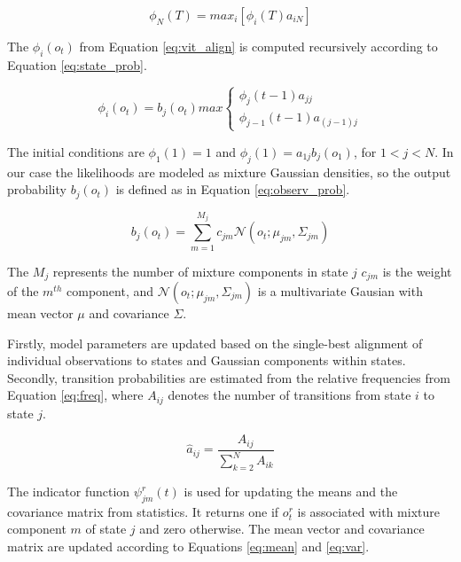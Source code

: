 \begin{equation}\label{eq:vit_align}
    \phi_N(T)= max_i[\phi_i(T)a_{iN}] 
\end{equation}


The $\phi_i(o_t)$ from Equation \ref{eq:vit_align} is computed recursively according to Equation \ref{eq:state_prob}.

\begin{equation}\label{eq:state_prob}
  \phi_i(o_t) = b_j(o_t) max \left\{
  \begin{array}{lr}
    \phi_j(t-1)a_{jj}\\
    \phi_{j-1}(t-1)a_{(j-1)j}
  \end{array}
  \right.
\end{equation}

The initial conditions are $\phi_1(1)=1$ and $\phi_j(1)= a_{1j}b_j(o_1)$, for $ 1 < j < N$. In our case the likelihoods are modeled as mixture Gaussian densities, so the output probability $b_j(o_t)$ is defined as in Equation \ref{eq:observ_prob}.

\begin{equation}\label{eq:observ_prob}
  b_j(o_t) = \sum_{m=1}^{M_j}{c_{jm}\mathcal{N}(o_t; \mu_{jm}, \Sigma_{jm})}
\end{equation}

The $M_j$ represents the number of mixture components in state $j$ $c_{jm}$ is the weight of the $m^{th}$ component, and $\mathcal{N}(o_t; \mu_{jm}, \Sigma_{jm})$ is a multivariate Gausian with mean vector $\mu$ and covariance $\Sigma$.

Firstly, model parameters are updated based on the single-best alignment of individual observations to states and Gaussian components within states. Secondly, transition probabilities are estimated from the relative frequencies from Equation \ref{eq:freq}, where $A_{ij}$ denotes the number of transitions from state $i$ to state $j$.

\begin{equation}\label{eq:freq}
  \hat{a}_{ij} = \frac{A_{ij}}{\sum_{k=2}^{N}{A_{ik}}}
\end{equation}

The indicator function $\psi^r_{jm}(t)$ is used for updating the means and the covariance matrix from statistics. It returns one if $o^r_t$ is associated with mixture component $m$ of state $j$ and zero otherwise. The mean vector and covariance matrix are updated according to Equations \ref{eq:mean} and \ref{eq:var}.

